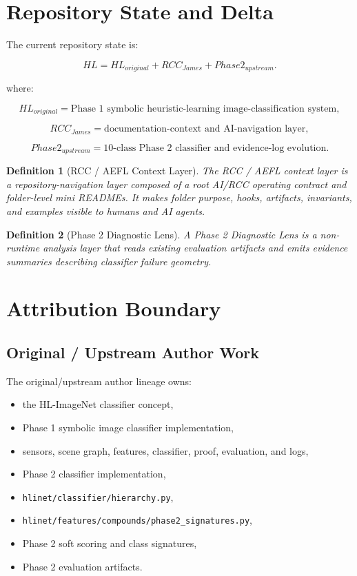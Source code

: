 \documentclass[12pt]{article}
\newtheorem{definition}{Definition}
\begin{document}
\section{Repository State and Delta}

The current repository state is:

\[
\boxed{
HL
=
HL_{original}
+
RCC_{James}
+
Phase2_{upstream}.
}
\]

where:

\[
HL_{original}
=
\text{Phase 1 symbolic heuristic-learning image-classification system},
\]

\[
RCC_{James}
=
\text{documentation-context and AI-navigation layer},
\]

\[
Phase2_{upstream}
=
\text{10-class Phase 2 classifier and evidence-log evolution}.
\]

\begin{definition}[RCC / AEFL Context Layer]
The RCC / AEFL context layer is a repository-navigation layer composed of a
root AI/RCC operating contract and folder-level mini READMEs. It makes folder
purpose, hooks, artifacts, invariants, and examples visible to humans and AI
agents.
\end{definition}

\begin{definition}[Phase 2 Diagnostic Lens]
A Phase 2 Diagnostic Lens is a non-runtime analysis layer that reads existing
evaluation artifacts and emits evidence summaries describing classifier failure
geometry.
\end{definition}

\section{Attribution Boundary}

\subsection{Original / Upstream Author Work}

The original/upstream author lineage owns:

\begin{itemize}
\item the HL-ImageNet classifier concept,
\item Phase 1 symbolic image classifier implementation,
\item sensors, scene graph, features, classifier, proof, evaluation, and logs,
\item Phase 2 classifier implementation,
\item \texttt{hlinet/classifier/hierarchy.py},
\item \texttt{hlinet/features/compounds/phase2\_signatures.py},
\item Phase 2 soft scoring and class signatures,
\item Phase 2 evaluation artifacts.
\end{itemize}
\end{document}
